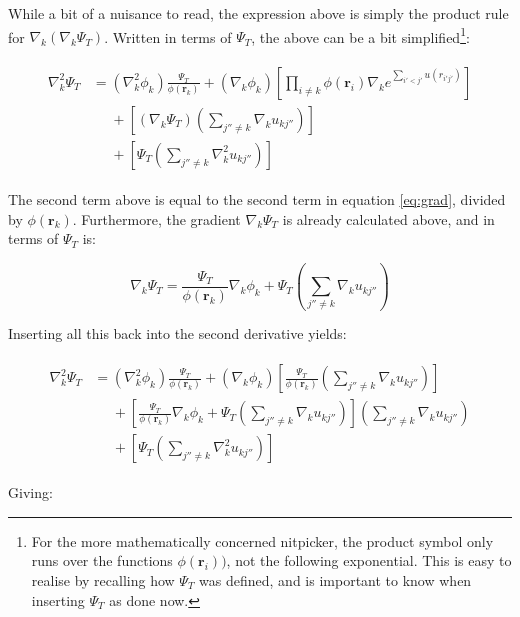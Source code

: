 \documentclass[english, a4paper]{article}
\newcommand{\bm}[1]{\mathbf{#1}}
\begin{document}
While a bit of a nuisance to read, the expression above is simply the product rule for $\nabla_k(\nabla_k\Psi_T)$. Written in terms of $\Psi_T$, the above can be a bit simplified\footnote{For the more mathematically concerned nitpicker, the product symbol only runs over the functions $\phi(\bm{r}_i))$, not the following exponential. This is easy to realise by recalling how $\Psi_T$ was defined, and is important to know when inserting $\Psi_T$ as done now.}:

\begin{align}
	\begin{split}
	\nabla_k^2\Psi_T &= (\nabla_k^2\phi_k)\frac{\Psi_T}{\phi(\bm{r}_k)} + (\nabla_k\phi_k) \left[\prod_{i\neq k}\phi(\bm{r}_i)\nabla_ke^{\sum_{i'<j'}u(r_{i'j'})}\right]\\
	&\:\:\:\:\:\: + \left[\left(\nabla_k\Psi_T\right)\left(\sum_{j''\neq k}\nabla_ku_{kj''} \right)\right]\\
	&\:\:\:\:\:\: + \left[\Psi_T\left(\sum_{j''\neq k}\nabla_k^2u_{kj''} \right)\right]
	\end{split}
\end{align}

The second term above is equal to the second term in equation \ref{eq:grad}, divided by $\phi(\bm{r}_k)$. Furthermore, the gradient $\nabla_k\Psi_T$ is already calculated above, and in terms of $\Psi_T$ is:

\begin{equation}
	\nabla_k\Psi_T = \frac{\Psi_T}{\phi(\bm{r}_k)}\nabla_k\phi_k + \Psi_T\left(\sum_{j''\neq k}\nabla_ku_{kj''} \right)
\end{equation}

Inserting all this back into the second derivative yields:

\begin{align}
	\begin{split}
	\nabla_k^2\Psi_T &= (\nabla_k^2\phi_k)\frac{\Psi_T}{\phi(\bm{r}_k)} + (\nabla_k\phi_k) \left[\frac{\Psi_T}{\phi(\bm{r}_k)}\left(\sum_{j''\neq k}\nabla_ku_{kj''} \right)\right]\\
	&\:\:\:\:\:\: + \left[\frac{\Psi_T}{\phi(\bm{r}_k)}\nabla_k\phi_k + \Psi_T\left(\sum_{j''\neq k}\nabla_ku_{kj''} \right)\right]\left(\sum_{j''\neq k}\nabla_ku_{kj''} \right)\\
	&\:\:\:\:\:\: + \left[\Psi_T\left(\sum_{j''\neq k}\nabla_k^2u_{kj''} \right)\right]
	\end{split}
\end{align}

Giving:
\end{document}
